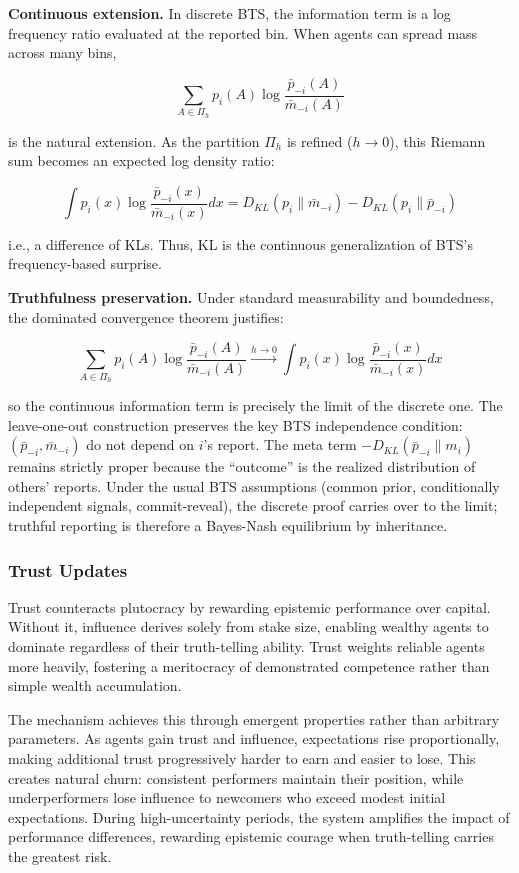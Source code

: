 \documentclass[11pt,a4paper]{article}
\begin{document}
\textbf{Continuous extension.} In discrete BTS, the information term is a log frequency ratio evaluated at the reported bin. When agents can spread mass across many bins,

$$\sum_{A \in \Pi_h} p_i(A) \log\frac{\bar{p}_{-i}(A)}{\bar{m}_{-i}(A)}$$

is the natural extension. As the partition $\Pi_h$ is refined ($h \to 0$), this Riemann sum becomes an expected log density ratio:

$$\int p_i(x) \log\frac{\bar{p}_{-i}(x)}{\bar{m}_{-i}(x)} dx = D_{KL}(p_i \| \bar{m}_{-i}) - D_{KL}(p_i \| \bar{p}_{-i})$$

i.e., a difference of KLs. Thus, KL is the continuous generalization of BTS's frequency-based surprise.

\textbf{Truthfulness preservation.} Under standard measurability and boundedness, the dominated convergence theorem justifies:

$$\sum_{A \in \Pi_h} p_i(A) \log\frac{\bar{p}_{-i}(A)}{\bar{m}_{-i}(A)} \xrightarrow{h \to 0} \int p_i(x) \log\frac{\bar{p}_{-i}(x)}{\bar{m}_{-i}(x)} dx$$

so the continuous information term is precisely the limit of the discrete one. The leave-one-out construction preserves the key BTS independence condition: $(\bar{p}_{-i}, \bar{m}_{-i})$ do not depend on $i$'s report. The meta term $-D_{KL}(\bar{p}_{-i} \| m_i)$ remains strictly proper because the ``outcome'' is the realized distribution of others' reports. Under the usual BTS assumptions (common prior, conditionally independent signals, commit-reveal), the discrete proof carries over to the limit; truthful reporting is therefore a Bayes-Nash equilibrium by inheritance.


\subsubsection*{Trust Updates}

Trust counteracts plutocracy by rewarding epistemic performance over capital. Without it, influence derives solely from stake size, enabling wealthy agents to dominate regardless of their truth-telling ability. Trust weights reliable agents more heavily, fostering a meritocracy of demonstrated competence rather than simple wealth accumulation.

The mechanism achieves this through emergent properties rather than arbitrary parameters. As agents gain trust and influence, expectations rise proportionally, making additional trust progressively harder to earn and easier to lose. This creates natural churn: consistent performers maintain their position, while underperformers lose influence to newcomers who exceed modest initial expectations. During high-uncertainty periods, the system amplifies the impact of performance differences, rewarding epistemic courage when truth-telling carries the greatest risk.
\end{document}
